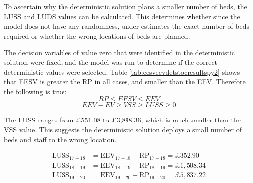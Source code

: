 \documentclass[../thesis.tex]{subfiles}
\begin{document}
To ascertain why the deterministic solution plans a smaller number of beds, the LUSS and LUDS values can be calculated. This determines whether since the model does not have any randomness, under estimates the exact number of beds required or whether the wrong locations of beds are planned. 

The decision variables of value zero that were identified in the deterministic solution were fixed, and the model was run to determine if the correct deterministic values were selected. Table \ref{tab:eesveevdetstocresultspy2} shows that EESV is greater the RP in all cases, and smaller than the EEV.
Therefore the following is true:
\begin{equation}
    RP \leq EESV \leq EEV 
\end{equation}
\begin{equation}
    EEV - EV \geq VSS \geq LUSS \geq 0
\end{equation}

The LUSS ranges from $\pounds$551.08 to $\pounds$3,898.36, which is much smaller than the VSS value. This suggests the deterministic solution deploys a small number of beds and staff to the wrong location.

\begin{align}
    \text{LUSS}_{17-18} &= \text{EEV}_{17-18} - \text{RP}_{17-18} = \pounds352.90  \\
    \text{LUSS}_{18-19} &= \text{EEV}_{18-19} - \text{RP}_{18-19} = \pounds1,508.34  \\
    \text{LUSS}_{19-20} &= \text{EEV}_{19-20} - \text{RP}_{19-20} = \pounds5,837.22
\end{align}
\end{document}

